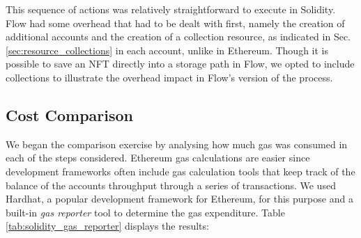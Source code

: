 \documentclass[../NFTComp_IEEE.tex]{subfiles}
\begin{document}
This sequence of actions was relatively straightforward to execute in Solidity. Flow had some overhead that had to be dealt with first, namely the creation of additional accounts and the creation of a collection resource, as indicated in Sec. \ref{sec:resource_collections} in each account, unlike in Ethereum. Though it is possible to save an NFT directly into a storage path in Flow, we opted to include collections to illustrate the overhead impact in Flow's version of the process.

\subsection{Cost Comparison}
\label{sec:cost_comparison}
We began the comparison exercise by analysing how much gas was consumed in each of the steps considered. Ethereum gas calculations are easier since development frameworks often include gas calculation tools that keep track of the balance of the accounts throughput through a series of transactions. We used Hardhat, a popular development framework for Ethereum, for this purpose and a built-in \textit{gas reporter} tool to determine the gas expenditure. Table \ref{tab:solidity_gas_reporter} displays the results:
\end{document}
